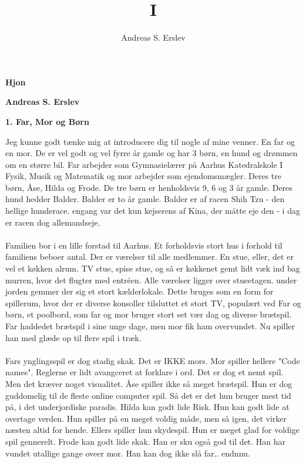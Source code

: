 \documentclass[]{article}
\title{I}
\author{Andreas S. Erslev}
\begin{document}
\begin{center}
	\Large\textbf{Hjon}
\end{center}

\begin{center}
	\large\textbf{Andreas S. Erslev}
\end{center}
	
\begin{center}
\large\textbf{1. Far, Mor og Børn}
\end{center}

Jeg kunne godt tænke mig at introducere dig til nogle af mine venner. En far og en mor. De er vel godt og vel fyrre år gamle og har 3 børn, en hund og drømmen om en større bil. Far arbejder som Gymnasielærer på Aarhus Katedralskole I Fysik, Musik og Matematik og mor arbejder som ejendomsmægler. Deres tre børn, Åse, Hilda og Frode. De tre børn er henholdsvis 9, 6 og 3 år gamle. Deres hund hedder Balder. Balder er to år gamle. Balder er af racen Shih Tzu - den hellige hunderace. engang var det kun kejserens af Kina, der måtte eje den - i dag er racen dog allemandseje.
\\ \\
Familien bor i en lille forstad til Aarhus. Et forholdsvis stort hus i forhold til familiens beboer antal. Der er værelser til alle medlemmer. En stue, eller, det er vel et køkken alrum. TV stue, spise stue, og så er køkkenet gemt lidt væk ind bag murren, hvor det flugter med entréen. Alle værelser ligger over stueetagen. under jorden gemmer der sig et stort kælderlokale. Dette bruges som en form for spillerum, hvor der er diverse konsoller tilsluttet et stort TV, populært ved Far og børn, et poolbord, som far og mor bruger stort set vær dag og diverse brætspil. Far haddedet brætspil i sine unge dage, men mor fik ham overvundet. Nu spiller han med glæde op til flere spil i træk. 
\\ \\
Fars ynglingsspil er dog stadig skak. Det er IKKE mors. Mor spiller hellere "Code names". Reglerne er lidt avangceret at forklare i ord. Det er dog et nemt spil. Men det kræver noget visualitet. Åse spiller ikke så meget brætspil. Hun er dog guddomelig til de fleste online computer spil. Så det er det hun bruger mest tid på, i det underjordiske paradis. Hilda kan godt lide Risk. Hun kan godt lide at overtage verden. Hun spiller på en meget voldig måde, men så igen, det virker næsten altid for hende. Ellers spiller hun skydespil. Hun er meget glad for voldige spil gennerelt. Frode kan godt lide skak. Han er sku også god til det. Han har vundet utallige gange oveer mor. Han kan dog ikke slå far.. endnnu. 
\end{document}
